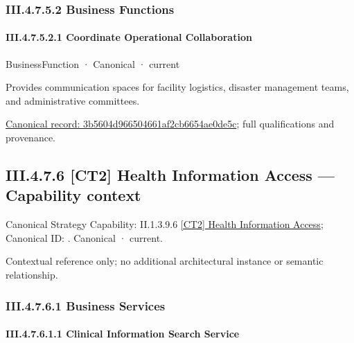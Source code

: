 \subsubsection*{III.4.7.5.2 Business Functions}
\label{navigation:III.4.7.5.2}

\paragraph*{III.4.7.5.2.1 Coordinate Operational Collaboration}
\label{navigation:III.4.7.5.2.1}

\label{element:3b5604d966504661af2cb6654ae0de5c}
{\small BusinessFunction · Canonical · current}\par

Provides communication spaces for facility logistics, disaster management teams, and administrative committees.


{\footnotesize \href{../../../../continuum/business/business-function/3b5604d966504661af2cb6654ae0de5c.md}{Canonical record: 3b5604d966504661af2cb6654ae0de5c}; full qualifications and provenance.}\par
\subsection*{III.4.7.6 [CT2] Health Information Access — Capability context}
\label{navigation:III.4.7.6}

{\small Canonical Strategy Capability: II.1.3.9.6 \hyperref[element:cc253aea3c5f489da0502df74dde1669]{[CT2] Health Information Access}; Canonical ID: \texttt{}. Canonical · current.}\par
Contextual reference only; no additional architectural instance or semantic relationship.\par
\subsubsection*{III.4.7.6.1 Business Services}
\label{navigation:III.4.7.6.1}

\paragraph*{III.4.7.6.1.1 Clinical Information Search Service}
\label{navigation:III.4.7.6.1.1}

